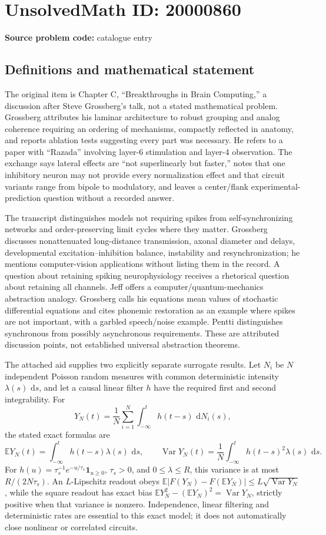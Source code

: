 \documentclass[11pt]{article}
\newcommand{\E}{\mathbb{E}}
\newcommand{\dd}{\,\mathrm{d}}
\begin{document}
\section*{UnsolvedMath ID: 20000860}
\textbf{Source problem code:} catalogue entry
\subsection{Definitions and mathematical statement}
The original item is Chapter C, ``Breakthroughs in Brain Computing,'' a discussion after Steve Grossberg's talk, not a stated mathematical problem. Grossberg attributes his laminar architecture to robust grouping and analog coherence requiring an ordering of mechanisms, compactly reflected in anatomy, and reports ablation tests suggesting every part was necessary. He refers to a paper with ``Razada'' involving layer-6 stimulation and layer-4 observation. The exchange says lateral effects are ``not superlinearly but faster,'' notes that one inhibitory neuron may not provide every normalization effect and that circuit variants range from bipole to modulatory, and leaves a center/flank experimental-prediction question without a recorded answer.

The transcript distinguishes models not requiring spikes from self-synchronizing networks and order-preserving limit cycles where they matter. Grossberg discusses nonattenuated long-distance transmission, axonal diameter and delays, developmental excitation--inhibition balance, instability and resynchronization; he mentions computer-vision applications without listing them in the record. A question about retaining spiking neurophysiology receives a rhetorical question about retaining all channels. Jeff offers a computer/quantum-mechanics abstraction analogy. Grossberg calls his equations mean values of stochastic differential equations and cites phonemic restoration as an example where spikes are not important, with a garbled speech/noise example. Pentti distinguishes synchronous from possibly asynchronous requirements. These are attributed discussion points, not established universal abstraction theorems.

The attached aid supplies two explicitly separate surrogate results. Let $N_i$ be $N$ independent Poisson random measures with common deterministic intensity $\lambda(s)\,\dd s$, and let a causal linear filter $h$ have the required first and second integrability. For
\[
Y_N(t)=\frac1N\sum_{i=1}^N\int_{-\infty}^t h(t-s)\,\dd N_i(s),
\]
the stated exact formulas are
\[
\E Y_N(t)=\int_{-\infty}^t h(t-s)\lambda(s)\,\dd s,\qquad
\operatorname{Var}Y_N(t)=\frac1N\int_{-\infty}^t h(t-s)^2\lambda(s)\,\dd s.
\]
For $h(u)=\tau_s^{-1}e^{-u/\tau_s}\mathbf1_{u\ge0}$, $\tau_s>0$, and $0\le\lambda\le R$, this variance is at most $R/(2N\tau_s)$. An $L$-Lipschitz readout obeys $\E|F(Y_N)-F(\E Y_N)|\le L\sqrt{\operatorname{Var}Y_N}$, while the square readout has exact bias $\E Y_N^2-(\E Y_N)^2=\operatorname{Var}Y_N$, strictly positive when that variance is nonzero. Independence, linear filtering and deterministic rates are essential to this exact model; it does not automatically close nonlinear or correlated circuits.
\end{document}
